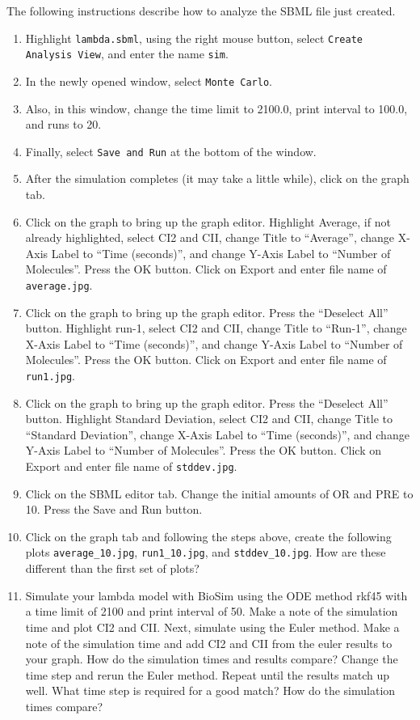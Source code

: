 \documentclass[titlepage,11pt]{article}
\begin{document}
The following instructions describe how to analyze the SBML file just 
created.
\begin{enumerate}
\item Highlight {\tt lambda.sbml}, using the right mouse button, select 
      {\tt Create Analysis View}, and enter the name {\tt sim}.
\item In the newly opened window, select {\tt Monte Carlo}.
\item Also, in this window, change the time limit to 2100.0, print interval
      to 100.0, and runs to 20.
\item Finally, select {\tt Save and Run} at the bottom of the window.
\item After the simulation completes (it may take a little while), click on
      the graph tab.
\item Click on the graph to bring up the graph editor.  Highlight Average,
      if not already highlighted, select CI2 and CII, change Title to
      ``Average'', change X-Axis Label to ``Time (seconds)'', and change
      Y-Axis Label to ``Number of Molecules''.  Press the OK button.
      Click on Export and enter file name of {\tt average.jpg}.
\item Click on the graph to bring up the graph editor.  Press the 
      ``Deselect All'' button.  Highlight run-1,
      select CI2 and CII, change Title to ``Run-1'', 
      change X-Axis Label to ``Time (seconds)'', and change
      Y-Axis Label to ``Number of Molecules''.  Press the OK button.
      Click on Export and enter file name of {\tt run1.jpg}.
\item Click on the graph to bring up the graph editor.  
      Press the ``Deselect All'' button.  Highlight Standard
      Deviation, select CI2 and CII, change Title to ``Standard Deviation'', 
      change X-Axis Label to ``Time (seconds)'', and change
      Y-Axis Label to ``Number of Molecules''.  Press the OK button.
      Click on Export and enter file name of {\tt stddev.jpg}.
\item Click on the SBML editor tab.  Change the initial amounts of OR and
      PRE to 10.  Press the Save and Run button.
\item Click on the graph tab and following the steps above, create the 
      following plots {\tt average\_10.jpg},  {\tt run1\_10.jpg}, and
      {\tt stddev\_10.jpg}.  How are these different than the first set
      of plots?  
\item Simulate your lambda model with BioSim using the ODE method rkf45 with
      a time limit of 2100 and print interval of 50.
      Make a note of the simulation time and plot CI2 and CII.  
      Next, simulate using the Euler method.  Make a note of the simulation time
      and add CI2 and CII from the euler results to your graph.  
      How do the simulation times and results compare?
      Change the time step and rerun the Euler method.  Repeat until the results
      match up well.  What time step is required for a good match?
      How do the simulation times compare?
\end{enumerate}
\end{document}
